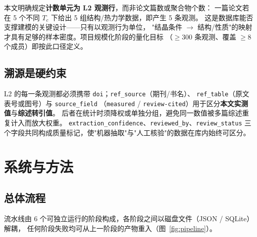 \documentclass[11pt,a4paper]{ctexart}
\begin{document}
本文明确规定\textbf{计数单元为 L2 观测行}，而非论文篇数或聚合物个数：
一篇论文若在 5 个不同 $T_c$ 下给出 5 组结构/热力学数据，即产生 5 条观测。
这是数据库能否支撑建模的关键设计——只有以观测行为单位，
"结晶条件 $\rightarrow$ 结构/性质"的映射才具有足够的样本密度。项目规模化阶段的量化目标
（$\geq 300$ 条观测、覆盖 $\geq 8$ 个成员）即按此口径定义。

\subsection{溯源是硬约束}

L2 的每一条观测都必须携带 \texttt{doi}；\texttt{ref\_source}（期刊/书名）、
\texttt{ref\_table}（原文表号或图号）与 \texttt{source\_field}
（\texttt{measured} / \texttt{review-cited}）用于区分\textbf{本文实测值}与\textbf{综述转引值}。
后者在统计时须降权或单独分组，避免同一数值被多篇综述重复计入而放大权重。
\texttt{extraction\_confidence}、\texttt{reviewed\_by}、\texttt{review\_status}
三个字段共同构成质量标记，使"机器抽取"与"人工核验"的数据在库内始终可区分。

\section{系统与方法}\label{sec:pipeline}

\subsection{总体流程}

流水线由 6 个可独立运行的阶段构成，各阶段之间以磁盘文件（JSON / SQLite）解耦，
任何阶段失败均可从上一阶段的产物重入（图~\ref{fig:pipeline}）。
\end{document}
